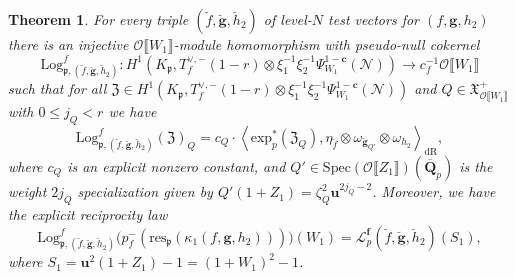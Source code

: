 \documentclass[10pt,letterpaper]{amsart}
\theoremstyle{plain}
\newtheorem{thm}{Theorem}[subsection] %
\theoremstyle{definition}
\theoremstyle{definition}
\theoremstyle{plain}
\theoremstyle{plain}
\theoremstyle{plain}
\theoremstyle{remark}
\numberwithin{equation}{section}
\newcommand{\cc}{\mathbf{c}}
\newcommand{\ch}{\xi}
\newcommand{\rH}{H}
\newcommand{\pp}{\mathfrak{p}}
\def\cO{\mathcal O}
\newcommand{\unb}{{\boldsymbol{f}}}
\newcommand{\Q}{\mathbf{Q}}
\newcommand{\dBr}[1]{\llbracket{#1}\rrbracket}
\newcommand{\bfg}{{\boldsymbol{g}}}
\begin{document}
\begin{thm}\label{thm:ERL-def}
For every triple $(\breve{f},\breve{\bfg},\breve{h}_2)$ of level-$N$ test vectors for $(f,\bfg,h_2)$ there is an injective $\cO\dBr{W_1}$-module homomorphism with pseudo-null cokernel
\[
{\mathrm{Log}}^f_{\pp,(\breve{f},\breve{\bfg},\breve{h}_2)}:\rH^1(K_\pp,T_f^{\vee,-}(1-r)\otimes\ch_1^{-1}\ch_2^{-1}\Psi_{W_1}^{1-\cc}(\mathscr{N}))\rightarrow c_f^{-1}\cO\dBr{W_1}
\]
such that for all $\mathfrak{Z}\in\rH^1(K_\pp,T_f^{\vee,-}(1-r)\otimes\ch_1^{-1}\ch_2^{-1}\Psi_{W_1}^{1-\cc}(\mathscr{N}))$ and $Q\in\mathfrak{X}_{\cO\dBr{W_1}}^{+}$ with $0\leq j_Q< r$ we have
\[
{\mathrm{Log}}^f_{\pp,(\breve{f},\breve{\bfg},\breve{h}_2)}(\mathfrak{Z})_Q=c_Q\cdot\left\langle{\mathrm{exp}}^*_p(\mathfrak{Z}_{Q}),\eta_{\breve{f}}\otimes\omega_{\breve{\bfg}_{Q'}}\otimes\omega_{h_2}\right\rangle_{\mathrm{dR}},
\]
where $c_Q$ is an explicit nonzero constant, and $Q'\in{\mathrm{Spec}}(\cO\dBr{Z_1})(\overline{\Q}_p)$ is the weight $2j_Q$ specialization given by $Q'(1+Z_1)=\zeta_Q^2\mathbf{u}^{2j_Q-2}$. Moreover, we have 
the \emph{explicit reciprocity law}
\[
{\mathrm{Log}}^f_{\pp,(\breve{f},\breve{\bfg},\breve{h}_2)}\bigl(p_f^-({\mathrm{res}}_\pp(\kappa_1(f,\bfg,h_2)))\bigr)(W_1)=\mathscr{L}_p^{\unb}(\breve{f},\breve{\bfg},\breve{h}_2)(S_1),
\]
where $S_1=\mathbf{u}^2(1+Z_1)-1=(1+W_1)^2-1$.
\end{thm}
\end{document}
